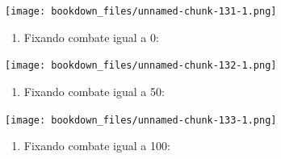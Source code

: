 \documentclass[
]{article}
\newenvironment{Shaded}{\begin{snugshade}}{\end{snugshade}}
\newcommand{\DataTypeTok}[1]{\textcolor[rgb]{0.13,0.29,0.53}{#1}}
\newcommand{\DecValTok}[1]{\textcolor[rgb]{0.00,0.00,0.81}{#1}}
\newcommand{\KeywordTok}[1]{\textcolor[rgb]{0.13,0.29,0.53}{\textbf{#1}}}
\newcommand{\NormalTok}[1]{#1}
\newcommand{\OperatorTok}[1]{\textcolor[rgb]{0.81,0.36,0.00}{\textbf{#1}}}
\newcommand{\StringTok}[1]{\textcolor[rgb]{0.31,0.60,0.02}{#1}}
\providecommand{\tightlist}{%
  \setlength{\itemsep}{0pt}\setlength{\parskip}{0pt}}
\begin{document}
\texttt{[image: bookdown\_files/unnamed-chunk-131-1.png]}

\begin{enumerate}
\def\labelenumi{\arabic{enumi}.}
\setcounter{enumi}{6}
\tightlist
\item
  Fixando combate igual a 0:
\end{enumerate}

\begin{Shaded}
\end{Shaded}

\texttt{[image: bookdown\_files/unnamed-chunk-132-1.png]}

\begin{enumerate}
\def\labelenumi{\arabic{enumi}.}
\setcounter{enumi}{7}
\tightlist
\item
  Fixando combate igual a 50:
\end{enumerate}

\begin{Shaded}
\end{Shaded}

\texttt{[image: bookdown\_files/unnamed-chunk-133-1.png]}

\begin{enumerate}
\def\labelenumi{\arabic{enumi}.}
\setcounter{enumi}{8}
\tightlist
\item
  Fixando combate igual a 100:
\end{enumerate}

\begin{Shaded}
\end{Shaded}
\end{document}
